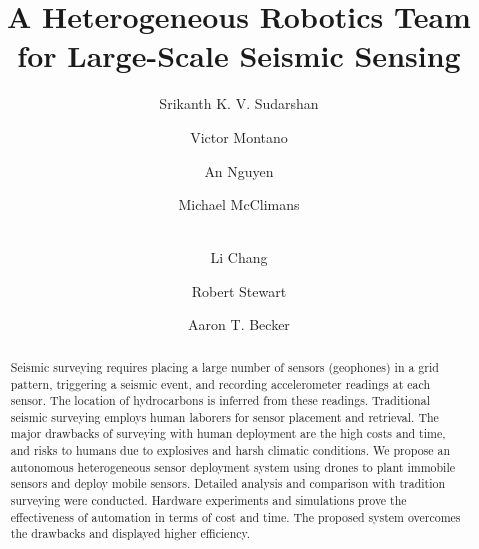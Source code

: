 \documentclass[letterpaper, 10 pt, conference]{ieeeconf}
\begin{document}
%
\title{A Heterogeneous Robotics Team for Large-Scale Seismic Sensing} 

\author[1]{\rm Srikanth K. V. Sudarshan}
\author[1]{\rm Victor Montano}
\author[1]{\rm An Nguyen}
\author[2]{\rm Michael McClimans}
\author[2]{\rm \\Li Chang}
\author[2]{\rm Robert Stewart}
\author[1]{\rm Aaron T. Becker}
\maketitle


\begin{abstract}
Seismic surveying requires placing a large number of sensors (geophones) in a grid pattern, triggering a seismic event, and recording accelerometer readings at each sensor. 
The location of hydrocarbons is inferred from these readings.
Traditional seismic surveying employs human laborers for sensor placement and retrieval. 
The major drawbacks of surveying with human deployment are the high costs and time, and risks to humans due to explosives and harsh climatic conditions.
We propose an autonomous heterogeneous sensor deployment system using drones to plant immobile sensors and deploy mobile sensors.
Detailed analysis and comparison with tradition surveying were conducted. 
Hardware experiments and simulations prove the effectiveness of automation in terms of cost and time. 
The proposed system overcomes the drawbacks and displayed higher efficiency.
\end{abstract}


%

%

%

%

%

%






\end{document}
